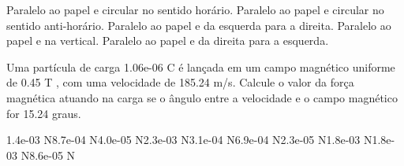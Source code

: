 \documentclass[12pt, addpoints]{exam}
\begin{document}
\begin{questions}
\begin{multicols*}{2}
\begin{choices}
\choice Paralelo ao papel e circular no sentido horário. 
\choice Paralelo ao papel e circular no sentido anti-horário. 
\choice Paralelo ao papel e da esquerda para a direita. 
\choice Paralelo ao papel e na vertical. 
\choice Paralelo ao papel e da direita para a esquerda. 
\end{choices}
\question Uma partícula de carga 1.06e-06 C é lançada em um campo magnético uniforme de    0.45 T , com uma velocidade de 185.24 m/s. Calcule o valor da força magnética atuando na carga se o ângulo entre a velocidade e o campo magnético for   15.24 graus.

\begin{oneparchoices}
\choice 1.4e-03 N\choice 8.7e-04 N\choice 4.0e-05 N\choice 2.3e-03 N\choice 3.1e-04 N\choice 6.9e-04 N\choice 2.3e-05 N\choice 1.8e-03 N\choice 1.8e-03 N\choice 8.6e-05 N
\end{oneparchoices}\end{multicols*}
\end{questions}
\newpage
\end{document}
